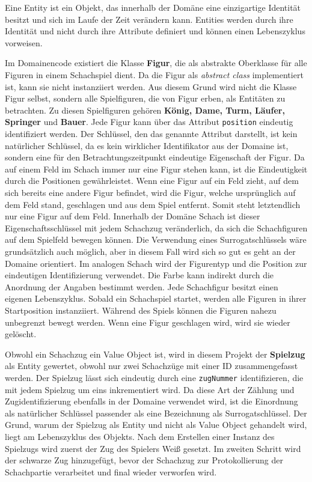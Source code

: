 Eine Entity ist ein Objekt, das innerhalb der Domäne eine einzigartige Identität besitzt und sich im Laufe der Zeit verändern kann. 
Entities werden durch ihre Identität und nicht durch ihre Attribute definiert und können einen Lebenszyklus vorweisen. 

Im Domainencode existiert die Klasse \textbf{Figur}, die als abstrakte Oberklasse für alle Figuren in einem Schachspiel dient. 
Da die Figur als \textit{abstract class} implementiert ist, kann sie nicht instanziiert werden. 
Aus diesem Grund wird nicht die Klasse Figur selbst, sondern alle Spielfiguren, die von Figur erben, als Entitäten zu betrachten. 
Zu diesen Spielfiguren gehören \textbf{König, Dame, Turm, Läufer, Springer} und \textbf{Bauer}.
Jede Figur kann über das Attribut \texttt{position} eindeutig identifiziert werden.
Der Schlüssel, den das genannte Attribut darstellt, ist kein natürlicher Schlüssel, da es kein wirklicher Identifikator aus der Domaine ist, sondern eine für den Betrachtungszeitpunkt eindeutige Eigenschaft der Figur. 
Da auf einem Feld im Schach immer nur eine Figur stehen kann, ist die Eindeutigkeit durch die Positionen gewährleistet. 
Wenn eine Figur auf ein Feld zieht, auf dem sich bereits eine andere Figur befindet, wird die Figur, welche ursprünglich auf dem Feld stand, geschlagen und aus dem Spiel entfernt. 
Somit steht letztendlich nur eine Figur auf dem Feld. 
Innerhalb der Domäne \glqq Schach\grqq{} ist dieser Eigenschaftsschlüssel mit jedem Schachzug veränderlich, da sich die Schachfiguren auf dem Spielfeld bewegen können. 
Die Verwendung eines Surrogatschlüssels wäre grundsätzlich auch möglich, aber in diesem Fall wird sich so gut es geht an der Domaine orientiert. 
Im analogen Schach wird der Figurentyp und die Position zur eindeutigen Identifizierung verwendet. 
Die Farbe kann indirekt durch die Anordnung der Angaben bestimmt werden.
Jede Schachfigur besitzt einen eigenen Lebenszyklus.
Sobald ein Schachspiel startet, werden alle Figuren in ihrer Startposition instanziiert.
Während des Spiels können die Figuren nahezu unbegrenzt bewegt werden. 
Wenn eine Figur geschlagen wird, wird sie wieder gelöscht. 

Obwohl ein Schachzug ein Value Object ist, wird in diesem Projekt der \textbf{Spielzug} als Entity gewertet, obwohl nur zwei Schachzüge mit einer ID zusammengefasst werden. 
Der Spielzug lässt sich eindeutig durch eine \texttt{zugNummer} identifizieren, die mit jedem Spielzug um eins inkrementiert wird.
Da diese Art der Zählung und Zugidentifizierung ebenfalls in der Domaine verwendet wird, ist die Einordnung als natürlicher Schlüssel passender als eine Bezeichnung als Surrogatschlüssel.
Der Grund, warum der Spielzug als Entity und nicht als Value Object gehandelt wird, liegt am Lebenszyklus des Objekts. 
Nach dem Erstellen einer Instanz des Spielzugs wird zuerst der Zug des Spielers \glqq Weiß\grqq{} gesetzt.
Im zweiten Schritt wird der schwarze Zug hinzugefügt, bevor der Schachzug zur Protokollierung der Schachpartie verarbeitet und final wieder verworfen wird.  

